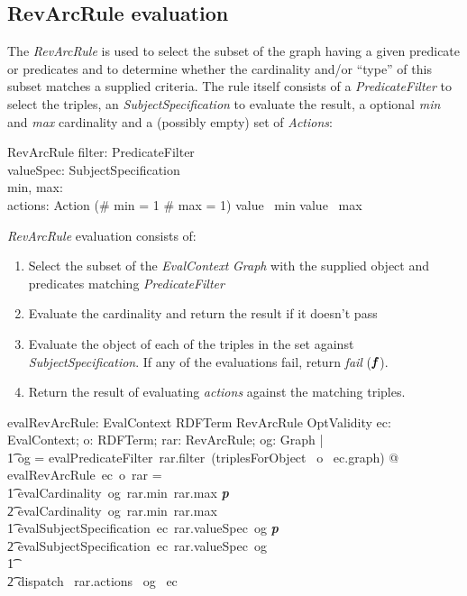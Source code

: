 \documentclass[fuzz]{llncs}
\def\pass{\textbf{\textit{p}}}
\def\fail{\textbf{\textit{f}}}
\def\zc{\textit}
\begin{document}
\subsection{RevArcRule evaluation}
The \zc{RevArcRule} is used to select the subset of the graph having a given predicate or
predicates and to determine whether the cardinality and/or ``type'' of this subset matches
a supplied criteria. The rule itself consists of a \zc{PredicateFilter} to select the triples,
 an \zc{SubjectSpecification} to evaluate the result, a optional \zc{min} and \zc{max}
 cardinality and a (possibly empty) set of \zc{Actions}:
\begin{schema}{RevArcRule}
   filter: PredicateFilter \\
   valueSpec: SubjectSpecification \\
   min, max: \optional[\nat] \\
   actions: \power Action
\where
   (\# min = 1 \land \# max = 1) \implies value~ min \leq value~ max
\end{schema}
\zc{RevArcRule} evaluation consists of:
\begin{enumerate}
\item Select the subset of the \zc{EvalContext} \zc{Graph} with the supplied object and predicates matching  \zc{PredicateFilter}
\item Evaluate the cardinality and return the result if it doesn't pass
\item Evaluate the object of each of the triples in the set against \zc{SubjectSpecification}.  If any of the evaluations fail, return \zc{fail} ($\fail$).
\item Return the result of evaluating \zc{actions} against the matching triples.
\end{enumerate}
\begin{axdef}
   evalRevArcRule: EvalContext \fun RDFTerm \fun RevArcRule \fun OptValidity
\where
   \forall ec: EvalContext; o: RDFTerm; rar: RevArcRule; og: Graph  | \\ 
\t1 og = evalPredicateFilter~rar.filter~(triplesForObject~ o~ ec.graph) @ \\
evalRevArcRule~ec~o~rar = \\
\t1 \IF evalCardinality~og~rar.min~rar.max \neq \pass \\
\t2 \THEN evalCardinality~og~rar.min~rar.max \\
\t1 \ELSE \IF evalSubjectSpecification~ec~rar.valueSpec~og \neq \pass \\
\t2 \THEN evalSubjectSpecification~ec~rar.valueSpec~og \\
\t1 \ELSE \\
\t2  dispatch~ rar.actions~ og~ ec 
\end{axdef}
\end{document}
